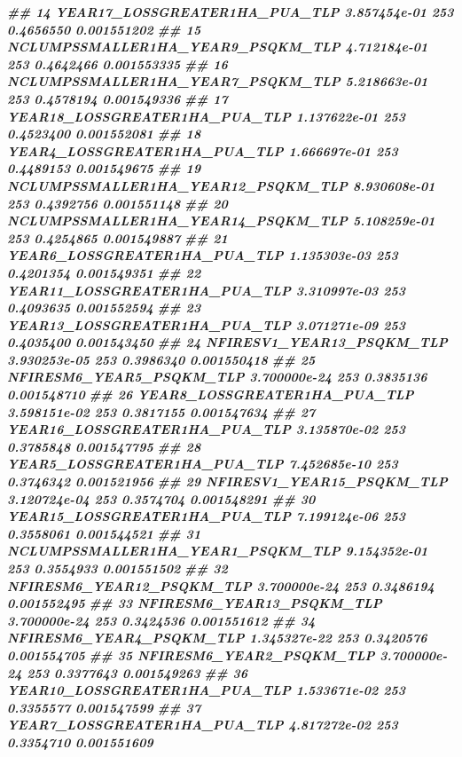 \documentclass[10pt,landscape,a3paper]{article}
\newenvironment{Shaded}{\begin{snugshade}}{\end{snugshade}}
\newcommand{\DocumentationTok}[1]{\textcolor[rgb]{0.56,0.35,0.01}{\textbf{\textit{#1}}}}
\begin{document}
\begin{Shaded}
\begin{Highlighting}[]
\DocumentationTok{\#\# 14      YEAR17\_LOSSGREATER1HA\_PUA\_TLP 3.857454e{-}01    253 0.4656550 0.001551202}
\DocumentationTok{\#\# 15  NCLUMPSSMALLER1HA\_YEAR9\_PSQKM\_TLP 4.712184e{-}01    253 0.4642466 0.001553335}
\DocumentationTok{\#\# 16  NCLUMPSSMALLER1HA\_YEAR7\_PSQKM\_TLP 5.218663e{-}01    253 0.4578194 0.001549336}
\DocumentationTok{\#\# 17      YEAR18\_LOSSGREATER1HA\_PUA\_TLP 1.137622e{-}01    253 0.4523400 0.001552081}
\DocumentationTok{\#\# 18       YEAR4\_LOSSGREATER1HA\_PUA\_TLP 1.666697e{-}01    253 0.4489153 0.001549675}
\DocumentationTok{\#\# 19 NCLUMPSSMALLER1HA\_YEAR12\_PSQKM\_TLP 8.930608e{-}01    253 0.4392756 0.001551148}
\DocumentationTok{\#\# 20 NCLUMPSSMALLER1HA\_YEAR14\_PSQKM\_TLP 5.108259e{-}01    253 0.4254865 0.001549887}
\DocumentationTok{\#\# 21       YEAR6\_LOSSGREATER1HA\_PUA\_TLP 1.135303e{-}03    253 0.4201354 0.001549351}
\DocumentationTok{\#\# 22      YEAR11\_LOSSGREATER1HA\_PUA\_TLP 3.310997e{-}03    253 0.4093635 0.001552594}
\DocumentationTok{\#\# 23      YEAR13\_LOSSGREATER1HA\_PUA\_TLP 3.071271e{-}09    253 0.4035400 0.001543450}
\DocumentationTok{\#\# 24          NFIRESV1\_YEAR13\_PSQKM\_TLP 3.930253e{-}05    253 0.3986340 0.001550418}
\DocumentationTok{\#\# 25           NFIRESM6\_YEAR5\_PSQKM\_TLP 3.700000e{-}24    253 0.3835136 0.001548710}
\DocumentationTok{\#\# 26       YEAR8\_LOSSGREATER1HA\_PUA\_TLP 3.598151e{-}02    253 0.3817155 0.001547634}
\DocumentationTok{\#\# 27      YEAR16\_LOSSGREATER1HA\_PUA\_TLP 3.135870e{-}02    253 0.3785848 0.001547795}
\DocumentationTok{\#\# 28       YEAR5\_LOSSGREATER1HA\_PUA\_TLP 7.452685e{-}10    253 0.3746342 0.001521956}
\DocumentationTok{\#\# 29          NFIRESV1\_YEAR15\_PSQKM\_TLP 3.120724e{-}04    253 0.3574704 0.001548291}
\DocumentationTok{\#\# 30      YEAR15\_LOSSGREATER1HA\_PUA\_TLP 7.199124e{-}06    253 0.3558061 0.001544521}
\DocumentationTok{\#\# 31  NCLUMPSSMALLER1HA\_YEAR1\_PSQKM\_TLP 9.154352e{-}01    253 0.3554933 0.001551502}
\DocumentationTok{\#\# 32          NFIRESM6\_YEAR12\_PSQKM\_TLP 3.700000e{-}24    253 0.3486194 0.001552495}
\DocumentationTok{\#\# 33          NFIRESM6\_YEAR13\_PSQKM\_TLP 3.700000e{-}24    253 0.3424536 0.001551612}
\DocumentationTok{\#\# 34           NFIRESM6\_YEAR4\_PSQKM\_TLP 1.345327e{-}22    253 0.3420576 0.001554705}
\DocumentationTok{\#\# 35           NFIRESM6\_YEAR2\_PSQKM\_TLP 3.700000e{-}24    253 0.3377643 0.001549263}
\DocumentationTok{\#\# 36      YEAR10\_LOSSGREATER1HA\_PUA\_TLP 1.533671e{-}02    253 0.3355577 0.001547599}
\DocumentationTok{\#\# 37       YEAR7\_LOSSGREATER1HA\_PUA\_TLP 4.817272e{-}02    253 0.3354710 0.001551609}

\end{Highlighting}
\end{Shaded}
\end{document}
